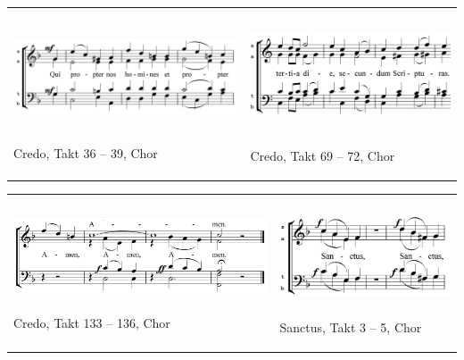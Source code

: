 \begin{flushleft}
\tablefirsthead{}
\tablehead{}
\tabletail{}
\tablelasttail{}
\begin{supertabular}{m{8.281cm}m{7.6990004cm}}

\includegraphics[width=8.098cm,height=3.069cm]{pictures/zulassungsarbeit-img111.png}

Credo, Takt 36 – 39, Chor &

\includegraphics[width=7.207cm,height=3.216cm]{pictures/zulassungsarbeit-img112.png}

Credo, Takt 69 – 72, Chor\\
\end{supertabular}
\end{flushleft}
\begin{flushleft}
\tablefirsthead{}
\tablehead{}
\tabletail{}
\tablelasttail{}
\begin{supertabular}{m{8.778cm}m{6.208cm}}

\includegraphics[width=8.595cm,height=2.515cm]{pictures/zulassungsarbeit-img113.png}

Credo, Takt 133 – 136, Chor &

\includegraphics[width=5.681cm,height=2.76cm]{pictures/zulassungsarbeit-img114.png}

Sanctus, Takt 3 – 5, Chor\\
\end{supertabular}
\end{flushleft}
